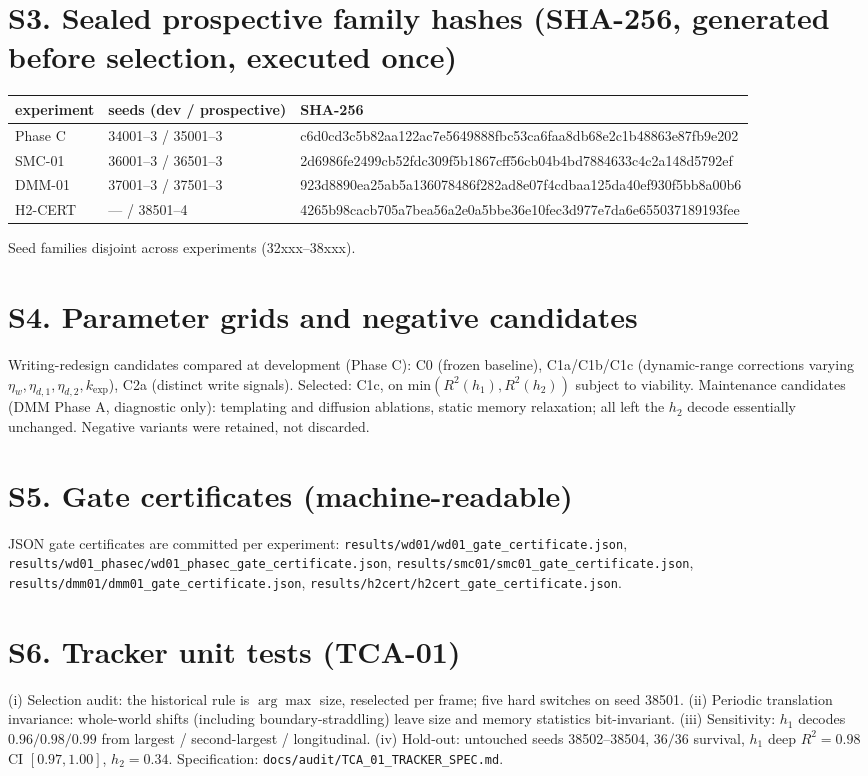 \documentclass[11pt]{article}
\begin{document}
\section{S3. Sealed prospective family hashes (SHA-256, generated before selection, executed once)}
\begin{longtable}{@{}lll@{}}\toprule experiment & seeds (dev / prospective) & SHA-256\\\midrule
Phase C & 34001--3 / 35001--3 & c6d0cd3c5b82aa122ac7e5649888fbc53ca6faa8db68e2c1b48863e87fb9e202\\
SMC-01 & 36001--3 / 36501--3 & 2d6986fe2499cb52fdc309f5b1867cff56cb04b4bd7884633c4c2a148d5792ef\\
DMM-01 & 37001--3 / 37501--3 & 923d8890ea25ab5a136078486f282ad8e07f4cdbaa125da40ef930f5bb8a00b6\\
H2-CERT & --- / 38501--4 & 4265b98cacb705a7bea56a2e0a5bbe36e10fec3d977e7da6e655037189193fee\\\bottomrule\end{longtable}
Seed families disjoint across experiments (32xxx--38xxx).

\section{S4. Parameter grids and negative candidates}
Writing-redesign candidates compared at development (Phase C): C0 (frozen baseline), C1a/C1b/C1c (dynamic-range
corrections varying $\eta_w,\eta_{d,1},\eta_{d,2},k_{\exp}$), C2a (distinct write signals). Selected: C1c, on
min$(R^2(h_1),R^2(h_2))$ subject to viability. Maintenance candidates (DMM Phase A, diagnostic only): templating and
diffusion ablations, static memory relaxation; all left the $h_2$ decode essentially unchanged. Negative variants
were retained, not discarded.

\section{S5. Gate certificates (machine-readable)}
JSON gate certificates are committed per experiment: \texttt{results/wd01/wd01\_gate\_certificate.json},
\texttt{results/wd01\_phasec/wd01\_phasec\_gate\_certificate.json},
\texttt{results/smc01/smc01\_gate\_certificate.json},
\texttt{results/dmm01/dmm01\_gate\_certificate.json},
\texttt{results/h2cert/h2cert\_gate\_certificate.json}.

\section{S6. Tracker unit tests (TCA-01)}
(i) Selection audit: the historical rule is $\arg\max$ size, reselected per frame; five hard switches on seed
38501. (ii) Periodic translation invariance: whole-world shifts (including boundary-straddling) leave size and
memory statistics bit-invariant. (iii) Sensitivity: $h_1$ decodes $0.96/0.98/0.99$ from largest / second-largest /
longitudinal. (iv) Hold-out: untouched seeds 38502--38504, $36/36$ survival, $h_1$ deep $R^2=0.98$ CI $[0.97,1.00]$,
$h_2=0.34$. Specification: \texttt{docs/audit/TCA\_01\_TRACKER\_SPEC.md}.
\end{document}
